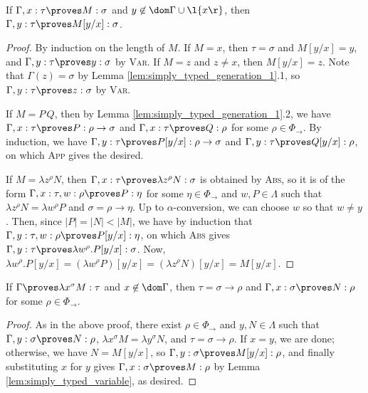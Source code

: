 \documentclass[reqno]{amsart}
\begin{document}
    \begin{lemma}\label{lem:simply_typed_variable}
        If $\Gamma,x:\tau\proves M:\sigma$ and $y\not\in\dom\Gamma\cup\l\{x\r\}$, then $\Gamma,y:\tau\proves M[y/x]:\sigma$.
    \end{lemma}
    \begin{proof}
        By induction on the length of $M$. If $M=x$, then $\tau=\sigma$ and $M[y/x]=y$, and $\Gamma,y:\tau\proves y:\sigma$ by \textsc{Var}. If $M=z$ and $z\neq x$, then $M[y/x]=z$. Note that $\Gamma(z)=\sigma$ by Lemma \ref{lem:simply_typed_generation_1}.1, so $\Gamma,y:\tau\proves z:\sigma$ by \textsc{Var}.

        If $M=P\,Q$, then by Lemma \ref{lem:simply_typed_generation_1}.2, we have $\Gamma,x:\tau\proves P:\rho\rightarrow\sigma$ and $\Gamma,x:\tau\proves Q:\rho$ for some $\rho\in\Phi_\rightarrow$. By induction, we have $\Gamma,y:\tau\proves P[y/x]:\rho\rightarrow\sigma$ and $\Gamma,y:\tau\proves Q[y/x]:\rho$, on which \textsc{App} gives the desired.

        If $M=\lambda z^\rho N$, then $\Gamma,x:\tau\proves\lambda z^\rho N:\sigma$ is obtained by \textsc{Abs}, so it is of the form $\Gamma,x:\tau,w:\rho\proves P:\eta$ for some $\eta\in\Phi_\rightarrow$ and $w,P\in\Lambda$ such that $\lambda z^\rho N=\lambda w^\rho P$ and $\sigma=\rho\to\eta$. Up to $\alpha$-conversion, we can choose $w$ so that $w\neq y$. Then, since $|P|=|N|<|M|$, we have by induction that $\Gamma,y:\tau,w:\rho\proves P[y/x]:\eta$, on which \textsc{Abs} gives $\Gamma,y:\tau\proves\lambda w^\rho.P[y/x]:\sigma$. Now, $\lambda w^\rho.P[y/x]=(\lambda w^\rho P)[y/x]=(\lambda z^\rho N)[y/x]=M[y/x]$.
    \end{proof}

    \begin{lemma}\label{lem:simply_typed_generation_2}
        If $\Gamma\proves\lambda x^\sigma M:\tau$ and $x\not\in\dom\Gamma$, then $\tau=\sigma\rightarrow\rho$ and $\Gamma,x:\sigma\proves N:\rho$ for some $\rho\in\Phi_\rightarrow$.
    \end{lemma}
    \begin{proof}
        As in the above proof, there exist $\rho\in\Phi_\rightarrow$ and $y,N\in\Lambda$ such that $\Gamma,y:\sigma\proves N:\rho$, $\lambda x^\sigma M=\lambda y^\sigma N$, and $\tau=\sigma\rightarrow\rho$. If $x=y$, we are done; otherwise, we have $N=M[y/x]$, so $\Gamma,y:\sigma\proves M[y/x]:\rho$, and finally substituting $x$ for $y$ gives $\Gamma,x:\sigma\proves M:\rho$ by Lemma \ref{lem:simply_typed_variable}, as desired.
    \end{proof}
\end{document}
